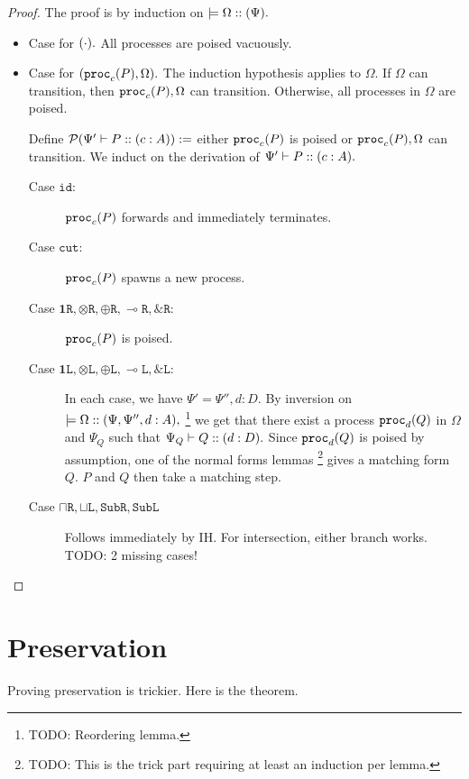 \documentclass[11pt]{article}
\theoremstyle{plain}
\theoremstyle{definition}
\theoremstyle{remark}
\newcommand\todo[1]{{\huge \color{red} TODO: {#1}}}
\DeclarePairedDelimiter\parens{(}{)}             %
\newcommand\lolli{\multimap}
\newcommand\terminate{\mathbf{1}}
\newcommand\tensor{\otimes}
\newcommand\internal{\oplus}
\newcommand\external{\&}
\newcommand\intersect{\mathbin{\sqcap}}
\newcommand\union{\mathbin{\sqcup}}
\newcommand\seq{\;;\;}
\newcommand\tclose[1]{\mathrm{close}\;#1}
\newcommand\twait[2]{\mathrm{wait}\;#1 \seq #2}
\newcommand\irb[1]{\texttt{#1}}
\newcommand\Right{\irb{R}}
\newcommand\Left{\irb{L}}
\newcommand\id{\irb{id}}
\newcommand\cut{\irb{cut}}
\newcommand{\ctx}{\Psi}
\newcommand{\config}{\Omega}
\newcommand\typeProc[3]{#1 :: \parens{#2 : #3}}
\newcommand\typeS[4]{#1 \vdash \typeProc{#2}{#3}{#4}}
\newcommand\proc[2]{\irb{proc}_{#1}\parens{#2}}
\newcommand\provides[2]{\models #1 :: \parens{#2}}
\newcommand\pred[1]{\mathcal{P}\parens*{#1}}
\begin{document}
\begin{proof}
The proof is by induction on $\provides{\config}{\ctx}.$
\begin{itemize}
  \item Case for $\parens{\cdot}.$ All processes are poised vacuously.
  \item Case for $\parens{\proc{c}{P}, \config}.$ The induction hypothesis applies to $\config.$ If $\config$ can transition, then $\proc{c}{P}, \config$ can transition. Otherwise, all processes in $\config$ are poised.

  Define $\pred{\typeS{\ctx'}{P}{c}{A}} :=$ either $\proc{c}{P}$ is poised or $\proc{c}{P}, \config$ can transition. We induct on the derivation of $\typeS{\ctx'}{P}{c}{A}.$
  \begin{description}
    \item[Case $\id:$] $\proc c P$ forwards and immediately terminates.
    \item[Case $\cut:$] $\proc c P$ spawns a new process.
    \item[Case $\terminate\Right, \tensor\Right, \internal\Right, \lolli\Right, \external\Right :$] $\proc c P$ is poised.
    \item[Case $\terminate\Left, \tensor\Left, \internal\Left, \lolli\Left, \external\Left :$] In each case, we have $\ctx' = \ctx'', d : D.$ By inversion on $\provides{\config}{\ctx, \ctx'', d : A},$%
    \footnote{TODO: Reordering lemma.}
    we get that there exist a process $\proc{d}{Q}$ in $\config$ and $\ctx_Q$ such that $\typeS{\ctx_Q}{Q}{d}{D}.$ Since $\proc{d}{Q}$ is poised by assumption, one of the normal forms lemmas%
    \footnote{TODO: This is the trick part requiring at least an induction per lemma.} gives a matching form $Q.$ $P$ and $Q$ then take a matching step.
    \item[Case $\intersect\Right, \union\Left, \irb{Sub}\Right, \irb{Sub}\Left$] Follows immediately by IH. For intersection, either branch works. \todo{2 missing cases!}
  \end{description}
\end{itemize}
\end{proof}


\section{Preservation}
Proving preservation is trickier. Here is the theorem.
\end{document}
